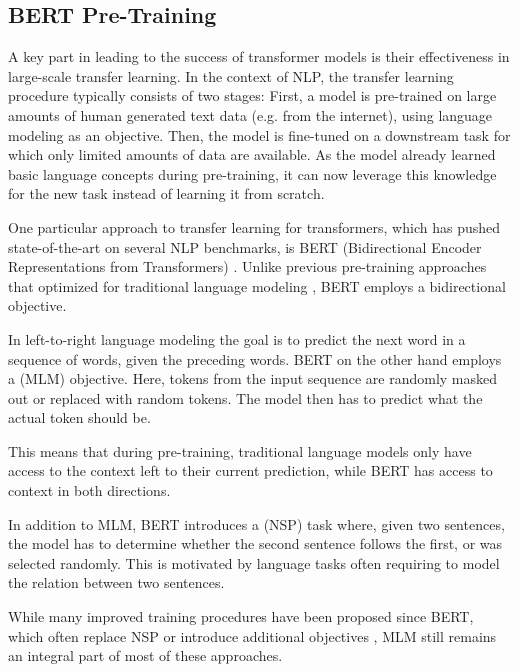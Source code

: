 \subsection{BERT Pre-Training}
A key part in leading to the success of transformer models is their effectiveness in large-scale transfer learning. In the context of NLP, the transfer learning procedure typically consists of two stages: First, a model is pre-trained on large amounts of human generated text data (e.g. from the internet), using language modeling as an objective. Then, the model is fine-tuned on a downstream task for which only limited amounts of data are available. As the model already learned basic language concepts during pre-training, it can now leverage this knowledge for the new task instead of learning it from scratch.

One particular approach to transfer learning for transformers, which has pushed state-of-the-art on several NLP benchmarks, is BERT (Bidirectional Encoder Representations from Transformers) \cite{devlin-etal-2019-bert}. Unlike previous pre-training approaches that optimized for traditional  language modeling \cite{DBLP:journals/corr/abs-1801-06146,Peters:2018,radford2018improving}, BERT employs a bidirectional objective.

In left-to-right language modeling the goal is to predict the next word in a sequence of words, given the preceding words. BERT on the other hand employs a  (MLM) objective. Here, tokens from the input sequence are randomly masked out or replaced with random tokens. The model then has to predict what the actual token should be.

This means that during pre-training, traditional language models only have access to the context left to their current prediction, while BERT has access to context in both directions.

In addition to MLM, BERT introduces a  (NSP) task where, given two sentences, the model has to determine whether the second sentence follows the first, or was selected randomly. This is motivated by language tasks often requiring to model the relation between two sentences.

While many improved training procedures have been proposed since BERT, which often replace NSP or introduce additional objectives \cite{DBLP:journals/corr/abs-2003-10555, DBLP:journals/corr/abs-1907-11692, 10.5555/3454287.3454804, Lan2020ALBERT}, MLM still remains an integral part of most of these approaches.

